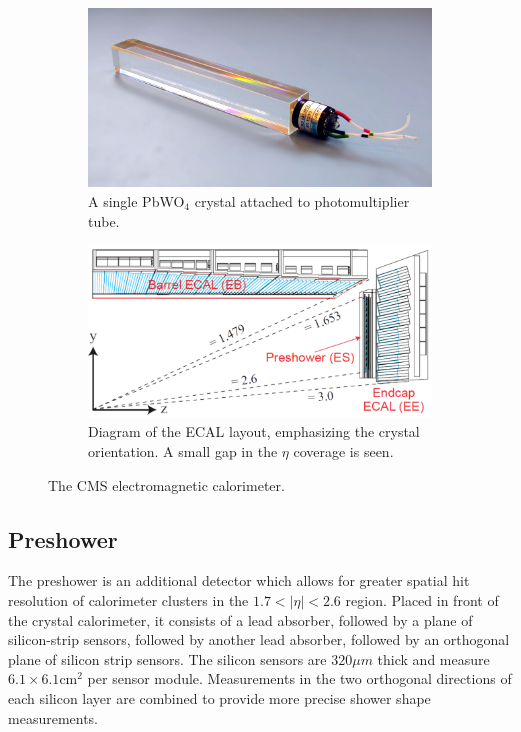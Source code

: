 \begin{figure}[hbp!]
\centering
\begin{subfigure}[c]{0.35\textwidth}
\includegraphics[width=\textwidth]{figs/ecalcrystal.jpg}
\caption{A single PbWO$_{4}$ crystal attached to photomultiplier tube.}
\label{fig:ecalcrystal}
\end{subfigure}
\begin{subfigure}[c]{0.625\textwidth}
\includegraphics[width=\textwidth]{figs/ecal.png}
\caption{Diagram of the ECAL layout, emphasizing the crystal orientation. A small gap in the $\eta$ coverage is seen.}
\label{fig:ecal}
\end{subfigure}
\caption{The CMS electromagnetic calorimeter.}
\end{figure}

\subsection{Preshower}

The preshower is an additional detector which allows for greater spatial hit resolution of calorimeter clusters in the $1.7<|\eta|<2.6$ region. Placed in front of the crystal calorimeter, it consists of a lead absorber, followed by a plane of silicon-strip sensors, followed by another lead absorber, followed by an orthogonal plane of silicon strip sensors. The silicon sensors are $320\mu m$ thick and measure $6.1\times6.1\textrm{cm}^{2}$ per sensor module. Measurements in the two orthogonal directions of each silicon layer are combined to provide more precise shower shape measurements.


